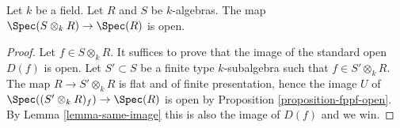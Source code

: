\begin{lemma}
\label{lemma-map-into-tensor-algebra-open}
Let $k$ be a field.
Let $R$ and $S$ be $k$-algebras.
The map $\Spec(S \otimes_k R) \to \Spec(R)$
is open.
\end{lemma}

\begin{proof}
Let $f \in S \otimes_k R$.
It suffices to prove that the image of the standard open $D(f)$ is open.
Let $S' \subset S$ be a finite type $k$-subalgebra such that
$f \in S' \otimes_k R$. The map $R \to S' \otimes_k R$ is flat
and of finite presentation, hence the image $U$ of
$\Spec((S' \otimes_k R)_f) \to \Spec(R)$ is open
by Proposition \ref{proposition-fppf-open}.
By Lemma \ref{lemma-same-image} this is also the image of $D(f)$ and we win.
\end{proof}
